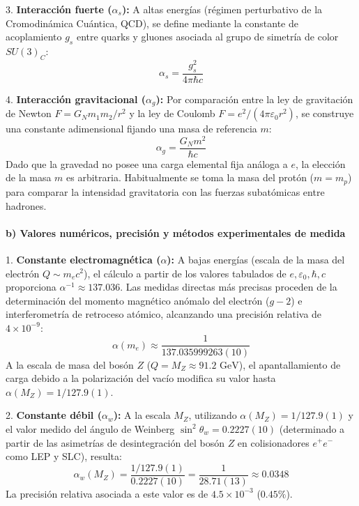 \begin{problema}
3. \textbf{Interacción fuerte ($\alpha_s$):} A altas energías (régimen perturbativo de la Cromodinámica Cuántica, QCD), se define mediante la constante de acoplamiento $g_s$ entre quarks y gluones asociada al grupo de simetría de color $SU(3)_C$:
\begin{equation}
\alpha_s = \frac{g_s^2}{4\pi \hbar c}
\end{equation}

4. \textbf{Interacción gravitacional ($\alpha_g$):} Por comparación entre la ley de gravitación de Newton $F = G_N m_1 m_2 / r^2$ y la ley de Coulomb $F = e^2 / (4\pi\varepsilon_0 r^2)$, se construye una constante adimensional fijando una masa de referencia $m$:
\begin{equation}
\alpha_g = \frac{G_N m^2}{\hbar c}
\end{equation}
Dado que la gravedad no posee una carga elemental fija análoga a $e$, la elección de la masa $m$ es arbitraria. Habitualmente se toma la masa del protón ($m = m_p$) para comparar la intensidad gravitatoria con las fuerzas subatómicas entre hadrones.

\paragraph{b) Valores numéricos, precisión y métodos experimentales de medida}

1. \textbf{Constante electromagnética ($\alpha$):}
A bajas energías (escala de la masa del electrón $Q \sim m_e c^2$), el cálculo a partir de los valores tabulados de $e, \varepsilon_0, \hbar, c$ proporciona $\alpha^{-1} \approx 137.036$. Las medidas directas más precisas proceden de la determinación del momento magnético anómalo del electrón ($g-2$) e interferometría de retroceso atómico, alcanzando una precisión relativa de $4 \times 10^{-9}$:
\begin{equation}
\alpha(m_e) \approx \frac{1}{137.035999263(10)}
\end{equation}
A la escala de masa del bosón $Z$ ($Q = M_Z \approx 91.2\text{ GeV}$), el apantallamiento de carga debido a la polarización del vacío modifica su valor hasta $\alpha(M_Z) = 1/127.9(1)$.

2. \textbf{Constante débil ($\alpha_w$):}
A la escala $M_Z$, utilizando $\alpha(M_Z) = 1/127.9(1)$ y el valor medido del ángulo de Weinberg $\sin^2\theta_w = 0.2227(10)$ (determinado a partir de las asimetrías de desintegración del bosón $Z$ en colisionadores $e^+e^-$ como LEP y SLC), resulta:
\begin{equation}
\alpha_w(M_Z) = \frac{1/127.9(1)}{0.2227(10)} = \frac{1}{28.71(13)} \approx 0.0348
\end{equation}
La precisión relativa asociada a este valor es de $4.5 \times 10^{-3}$ ($0.45\%$).


\end{problema}

